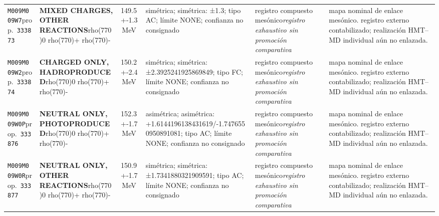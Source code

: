 \begin{landscape}
\begin{longtable}{L{1.85cm}L{4.45cm}L{2.35cm}L{4.05cm}L{3.35cm}L{7.15cm}}
\texttt{M009}\newline \texttt{M009W7}\newline prop.\ \texttt{333873} & \textbf{MIXED CHARGES, OTHER REACTIONS}\newline rho(770)0 \textbar{}\allowbreak{} rho(770)+ \textbar{}\allowbreak{} rho(770)- & 149.5+-1.3\,MeV & simétrica; simétrica: ±1.3; tipo AC; límite NONE; confianza no consignado & registro compuesto mesónico\newline \emph{registro exhaustivo sin promoción comparativa} & mapa nominal de enlace mesónico. registro externo contabilizado; realización HMT--MD individual aún no enlazada. \\
\texttt{M009}\newline \texttt{M009W2}\newline prop.\ \texttt{333874} & \textbf{CHARGED ONLY, HADROPRODUCED}\newline rho(770)0 \textbar{}\allowbreak{} rho(770)+ \textbar{}\allowbreak{} rho(770)- & 150.2+-2.4\,MeV & simétrica; simétrica: ±2.3925241925869849; tipo FC; límite NONE; confianza no consignado & registro compuesto mesónico\newline \emph{registro exhaustivo sin promoción comparativa} & mapa nominal de enlace mesónico. registro externo contabilizado; realización HMT--MD individual aún no enlazada. \\
\texttt{M009}\newline \texttt{M009W0P}\newline prop.\ \texttt{333876} & \textbf{NEUTRAL ONLY, PHOTOPRODUCED}\newline rho(770)0 \textbar{}\allowbreak{} rho(770)+ \textbar{}\allowbreak{} rho(770)- & 152.3+-1.7\,MeV & asimétrica; asimétrica: +1.6144196138431619/-1.7476550950891081; tipo AC; límite NONE; confianza no consignado & registro compuesto mesónico\newline \emph{registro exhaustivo sin promoción comparativa} & mapa nominal de enlace mesónico. registro externo contabilizado; realización HMT--MD individual aún no enlazada. \\
\texttt{M009}\newline \texttt{M009W0R}\newline prop.\ \texttt{333877} & \textbf{NEUTRAL ONLY, OTHER REACTIONS}\newline rho(770)0 \textbar{}\allowbreak{} rho(770)+ \textbar{}\allowbreak{} rho(770)- & 150.9+-1.7\,MeV & simétrica; simétrica: ±1.7341880321909591; tipo AC; límite NONE; confianza no consignado & registro compuesto mesónico\newline \emph{registro exhaustivo sin promoción comparativa} & mapa nominal de enlace mesónico. registro externo contabilizado; realización HMT--MD individual aún no enlazada. \\

\end{longtable}
\end{landscape}
